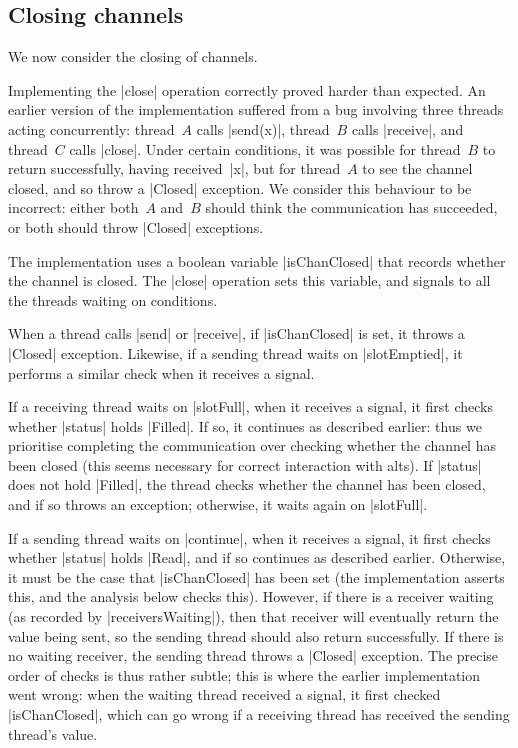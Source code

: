 \subsection{Closing channels}

\inlineScala

We now consider the closing of channels.  

Implementing the |close| operation correctly proved harder than expected.  An
earlier version of the implementation suffered from a bug involving three
threads acting concurrently: thread~$A$ calls |send(x)|, thread~$B$ calls
|receive|, and thread~$C$ calls |close|.  Under certain conditions, it was
possible for thread~$B$ to return successfully, having received~|x|, but for
thread~$A$ to see the channel closed, and so throw a |Closed| exception.  We
consider this behaviour to be incorrect: either both~$A$ and~$B$ should think
the communication has succeeded, or both should throw |Closed| exceptions.


The implementation uses a boolean variable |isChanClosed| that records whether
the channel is closed.  The |close| operation sets this variable, and signals
to all the threads waiting on conditions.

When a thread calls |send| or |receive|, if |isChanClosed| is set, it throws a
|Closed| exception.  Likewise, if a sending thread waits on |slotEmptied|, it
performs a similar check when it receives a signal.  

If a receiving thread waits on |slotFull|, when it receives a signal, it first
checks whether |status| holds |Filled|.  If so, it continues as described
earlier: thus we prioritise completing the communication over checking whether
the channel has been closed (this seems necessary for correct interaction with
alts).
If |status| does not hold |Filled|, the thread checks whether the channel has
been closed, and if so throws an exception; otherwise, it waits again on
|slotFull|.

If a sending thread waits on |continue|, when it receives a signal, it 
first checks whether |status| holds |Read|, and if so continues as described
earlier.  Otherwise, it must be the case that |isChanClosed| has been set (the
implementation asserts this, and the analysis below checks this).  However, if
there is a receiver waiting (as recorded by |receiversWaiting|), then that
receiver will eventually return the value being sent, so the sending thread
should also return successfully.  If there is no waiting receiver, the sending
thread throws a |Closed| exception.  The precise order of checks is thus
rather subtle; this is where the earlier implementation went wrong: when the
waiting thread received a signal, it first checked |isChanClosed|, which can
go wrong if a receiving thread has received the sending thread's value. 

